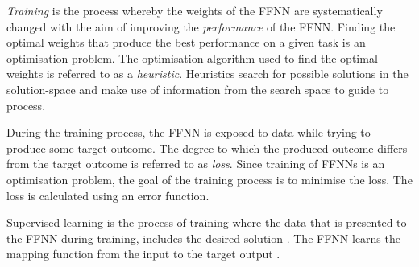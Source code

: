 \textit{Training} is the process whereby the weights of the \acs{FFNN} are systematically changed with the aim of improving the \textit{performance} of the \acs{FFNN}. Finding the optimal weights that produce the best performance on a given task is an optimisation problem. The optimisation algorithm used to find the optimal weights is referred to as a \textit{heuristic}. Heuristics search for possible solutions in the solution-space and make use of information from the search space to guide to process.

During the training process, the \acs{FFNN} is exposed to data while trying to produce some target outcome. The degree to which the produced outcome differs from the target outcome is referred to as \textit{loss}. Since training of \acp{FFNN} is an optimisation problem, the goal of the training process is to minimise the loss. The loss is calculated using an error function.

Supervised learning is the process of training where the data that is presented to the \acs{FFNN} during training, includes the desired solution \cite{ref:geron:2017}. The \acs{FFNN} learns the mapping function from the input to the target output \cite{ref:brownlee:2016}.
